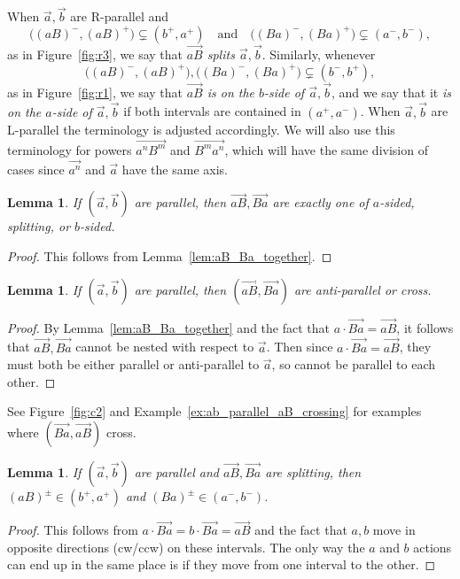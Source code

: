 \documentclass[11pt]{amsart}
\newcommand{\ora}[1]{\overrightarrow{#1}}
\numberwithin{equation}{section}
\numberwithin{figure}{section}
\newtheorem{lemma}[theorem]{Lemma}
\theoremstyle{definition}
\theoremstyle{plain}
\begin{document}
When $\ora{a},\ora{b}$ are R-parallel and
\[
\big((aB)^-,(aB)^+\big) \subsetneq (b^+,a^+)
\quad\text{and}\quad
\big((Ba)^-,(Ba)^+\big) \subsetneq (a^-,b^-),
\]
as in Figure~\ref{fig:r3}, we say that
\emph{$\ora{aB}$ splits $\ora{a},\ora{b}$}.
Similarly, whenever
\[
\big((aB)^-,(aB)^+\big),
\big((Ba)^-,(Ba)^+\big)
\subsetneq (b^-,b^+),
\]
as in Figure~\ref{fig:r1},
we say that \emph{$\ora{aB}$ is on the $b$-side of $\ora{a},\ora{b}$},
and we say that it \emph{is on the $a$-side of $\ora{a},\ora{b}$} if both intervals
are contained in $(a^+,a^-)$. When $\ora{a},\ora{b}$ are L-parallel
the terminology is adjusted accordingly. We will also use this
terminology for powers $\ora{a^n B^m}$ and $\ora{B^m a^n}$, which will
have the same division of cases since $\ora{a^n}$ and $\ora{a}$ have
the same axis.

\begin{lemma}
\label{lem:trichotomy_ab}
If $(\ora{a},\ora{b})$ are parallel, then $\ora{aB},\ora{Ba}$ are
exactly one of $a$-sided, splitting, or $b$-sided.
\end{lemma}
\begin{proof}
This follows from Lemma~\ref{lem:aB_Ba_together}.
\end{proof}

\begin{lemma}
\label{lem:aB_bA_antiparallel_cross}
If $(\ora{a},\ora{b})$ are parallel, then $(\ora{aB},\ora{Ba})$  are anti-parallel or cross.
\end{lemma}
\begin{proof}
By Lemma~\ref{lem:aB_Ba_together} and the fact that $a \cdot \ora{Ba} = \ora{aB}$,
it follows that $\ora{aB},\ora{Ba}$ cannot be nested with respect to $\ora{a}$.
Then since $a \cdot \ora{Ba} = \ora{aB}$, they must both be either parallel or anti-parallel to $\ora{a}$, so cannot be parallel to each other.
\end{proof}

See Figure~\ref{fig:c2} and Example~\ref{ex:ab_parallel_aB_crossing} for examples where $(\ora{Ba},\ora{aB})$ cross.

\begin{lemma}
If $(\ora{a},\ora{b})$ are parallel and $\ora{aB},\ora{Ba}$ are splitting,
then $(aB)^{\pm} \in (b^+, a^+)$ and $(Ba)^{\pm} \in (a^-,b^-)$.
\label{lem:splitting_specific}
\end{lemma}
\begin{proof}
This follows from $a \cdot \ora{Ba}= b \cdot \ora{Ba} =\ora{aB}$ and the fact that $a,b$ 
move in opposite directions (cw/ccw) on these intervals. The only way the $a$ and $b$ actions can end up in the same place is if they move from one interval to the other.
\end{proof}
\end{document}
